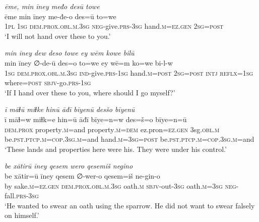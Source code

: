 \ea \label{DP.22}
\textit{ēme, min īney međo desū towe} \\ 
\gll ēme min īney me-đe-o des=ū to=we \\ 
 \textsc{1pl} \textsc{1sg} \textsc{dem.prox}\textsc{.obl}\textsc{.m}\textsc{.3sg} \textsc{neg-}give\textsc{.prs}\textsc{-3sg} hand\textsc{.m}\textsc{=ez}\textsc{.gen} \textsc{2sg}\textsc{=\textsc{post}} \\ 
\glt `I will not hand over these to you.'
\z 
 
\ea \label{DP.23}
\textit{min īney dew deso towe ey wēm kowe bilū} \\ 
\gll min īney ∅-de-ū des=o to=we ey wē=m ko=we bi-l-w \\ 
 \textsc{1sg} \textsc{dem.prox}\textsc{.obl}\textsc{.m}\textsc{.3sg} \textsc{ind-}give\textsc{.prs}\textsc{-1sg} hand\textsc{.m}\textsc{=\textsc{post}} \textsc{2sg}\textsc{=\textsc{post}} \textsc{intj} \textsc{reflx}\textsc{=1sg} where\textsc{=\textsc{post}} \textsc{sbjv-}go\textsc{.prs}\textsc{-1sg} \\ 
\glt `If I hand over these to you, where should I go myself?'
\z 
 
\ea \label{DP.28}
\textit{ī māɫū miɫke hinū āđī bīyenū desšo bīyenū} \\ 
\gll ī māɫ=w miɫk=e hin=ū āđī bīye=n=w des=š=o bīye=n=ū \\ 
 \textsc{dem.prox} property\textsc{.m}=and property\textsc{.m}\textsc{=dem} ez.pron\textsc{=ez}\textsc{.gen} 3sg\textsc{.obl}\textsc{.m} be\textsc{.pst}\textsc{.ptcp}\textsc{.m}\textsc{=cop}\textsc{.3sg}\textsc{.m}=and hand\textsc{.m}\textsc{=3sg}\textsc{=\textsc{post}} be\textsc{.pst}\textsc{.ptcp}\textsc{.m}\textsc{=cop}\textsc{.3sg}\textsc{.m}=and \\ 
\glt `These lands and properties here were his. They were under his control.'
\z 
 
\ea \label{DP.37}
\textit{be xātirū īney qesem wero qesemiš negino} \\ 
\gll be xātir=ū īney qesem ∅-wer-o qesem=iš ne-gin-o \\ 
 by sake\textsc{.m}\textsc{=ez}\textsc{.gen} \textsc{dem.prox}\textsc{.obl}\textsc{.m}\textsc{.3sg} oath\textsc{.m} \textsc{sbjv-}out\textsc{-3sg} oath\textsc{.m}\textsc{=3sg} \textsc{neg-}fall\textsc{.prs}\textsc{-3sg} \\ 
\glt `He wanted to swear an oath using the sparrow. He did not want to swear falsely on himself.'
\z 
 
